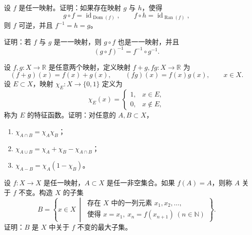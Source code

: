 \begin{exercise}
  \item 设 \(f\) 是任一映射。证明：如果存在映射 \(g\) 与 \(h\)，使得
  \[
  g\circ f=\operatorname{id}_{\operatorname{Dom}(f)},\qquad
  f\circ h=\operatorname{id}_{\operatorname{Ran}(f)},
  \]
  则 \(f\) 可逆，并且 \(f^{-1}=h=g\)。
\end{exercise}

\begin{exercise}
  \item 证明：若 \(f\) 与 \(g\) 是一一映射，则 \(g\circ f\) 也是一一映射，并且
  \[
  (g\circ f)^{-1}=f^{-1}\circ g^{-1}.
  \]
\end{exercise}

\begin{exercise}
  \item 设 \(f,g:X\to\mathbb{R}\) 是任意两个映射，定义映射 \(f+g,fg:X\to\mathbb{R}\) 为
  \[
  (f+g)(x)=f(x)+g(x),\qquad (fg)(x)=f(x)g(x),\qquad x\in X.
  \]
  设 \(E\subset X\)，映射 \(\chi_E:X\to\{0,1\}\) 定义为
  \[
  \chi_E(x)=
  \begin{cases}
    1,&x\in E,\\
    0,&x\notin E,
  \end{cases}
  \]
  称为 \(E\) 的特征函数。证明：对任意的 \(A,B\subset X\)，
  \begin{enumerate}[label=\arabic*)]
    \item \(\chi_{A\cap B}=\chi_A\chi_B\)；
    \item \(\chi_{A\cup B}=\chi_A+\chi_B-\chi_{A\cap B}\)；
    \item \(\chi_{A-B}=\chi_A(1-\chi_B)\)。
  \end{enumerate}
\end{exercise}

\begin{exercise}
  \item 设 \(f:X\to X\) 是任一映射，\(A\subset X\) 是任一非空集合。如果 \(f(A)=A\)，则称 \(A\) 关于 \(f\) 不变。构造 \(X\) 的子集
  \[
  B=\left\{x\in X\ \middle|\
  \begin{array}{l}
  \text{存在 }X\text{ 中的一列元素 }x_1,x_2,\ldots,\\
  \text{使得 }x=x_1,\ x_n=f(x_{n+1})\ (n\in\mathbb{N})
  \end{array}
  \right\}.
  \]
  证明：\(B\) 是 \(X\) 中关于 \(f\) 不变的最大子集。
\end{exercise}

